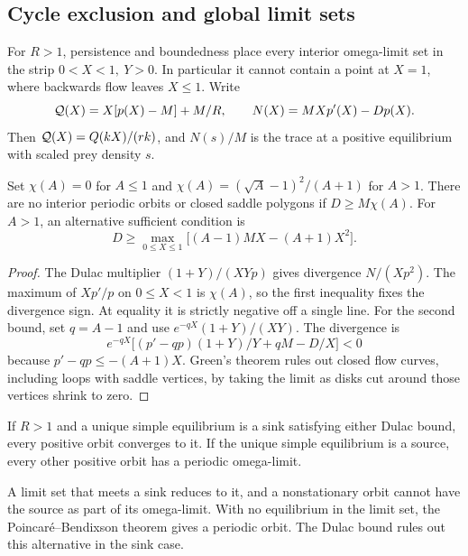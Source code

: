 \subsection{Cycle exclusion and global limit sets}
For \(R>1\), persistence and boundedness place every interior omega-limit set in the strip \(0<X<1,\ Y>0\). In particular it cannot contain a point at \(X=1\), where backwards flow leaves \(X\le1\). Write
\begin{equation}\label{eq:N}
 \mathcal Q(X)=X[p(X)-M]+M/R,\qquad N(X)=MXp'(X)-Dp(X).
\end{equation}
Then \(\mathcal Q(X)=Q(kX)/(rk)\), and \(N(s)/M\) is the trace at a positive equilibrium with scaled prey density \(s\).

\begin{theorem}\label{thm:dulac}
Set \(\chi(A)=0\) for \(A\le1\) and \(\chi(A)=(\sqrt A-1)^2/(A+1)\) for \(A>1\).
There are no interior periodic orbits or closed saddle polygons if \(D\ge M\chi(A)\). For \(A>1\), an alternative sufficient condition is
\[
 D\ge \max_{0\le X\le1}\big[(A-1)MX-(A+1)X^2\big].
\]
\end{theorem}
\begin{proof}
The Dulac multiplier \((1+Y)/(XYp)\) gives divergence \(N/(Xp^2)\). The maximum of \(Xp'/p\) on \(0\le X<1\) is \(\chi(A)\), so the first inequality fixes the divergence sign. At equality it is strictly negative off a single line. For the second bound, set \(q=A-1\) and use \(e^{-qX}(1+Y)/(XY)\). The divergence is
\[
 e^{-qX}\big[(p'-qp)(1+Y)/Y+qM-D/X\big]<0
\]
because \(p'-qp\le-(A+1)X\). Green's theorem rules out closed flow curves, including loops with saddle vertices, by taking the limit as disks cut around those vertices shrink to zero.
\end{proof}

\begin{corollary}\label{cor:pb}
If \(R>1\) and a unique simple equilibrium is a sink satisfying either Dulac bound, every positive orbit converges to it. If the unique simple equilibrium is a source, every other positive orbit has a periodic omega-limit.
\end{corollary}
A limit set that meets a sink reduces to it, and a nonstationary orbit cannot have the source as part of its omega-limit. With no equilibrium in the limit set, the Poincar\'e--Bendixson theorem gives a periodic orbit. The Dulac bound rules out this alternative in the sink case.

